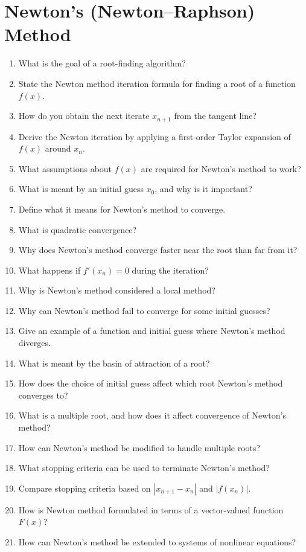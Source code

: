 \section{Newton's (Newton--Raphson) Method}
\begin{enumerate}
  \item What is the goal of a root-finding algorithm?
  \item State the Newton method iteration formula for finding a root of a function $f(x)$.
  \item How do you obtain the next iterate $x_{n+1}$ from the tangent line?
  \item Derive the Newton iteration by applying a first-order Taylor expansion of $f(x)$ around $x_n$.
  \item What assumptions about $f(x)$ are required for Newton's method to work?
  \item What is meant by an initial guess $x_0$, and why is it important?
  \item Define what it means for Newton's method to converge.
  \item What is quadratic convergence?
  \item Why does Newton's method converge faster near the root than far from it?
  \item What happens if $f'(x_n) = 0$ during the iteration?
  \item Why is Newton's method considered a local method?
  \item Why can Newton's method fail to converge for some initial guesses?
  \item Give an example of a function and initial guess where Newton's method diverges.
  \item What is meant by the basin of attraction of a root?
  \item How does the choice of initial guess affect which root Newton's method converges to?
  \item What is a multiple root, and how does it affect convergence of Newton's method?
  \item How can Newton's method be modified to handle multiple roots?
  \item What stopping criteria can be used to terminate Newton's method?
  \item Compare stopping criteria based on $|x_{n+1} - x_n|$ and $|f(x_n)|$.
  \item How is Newton method formulated in terms of a vector-valued function $F(x)$?
  \item How can Newton's method be extended to systems of nonlinear equations?

\end{enumerate}
